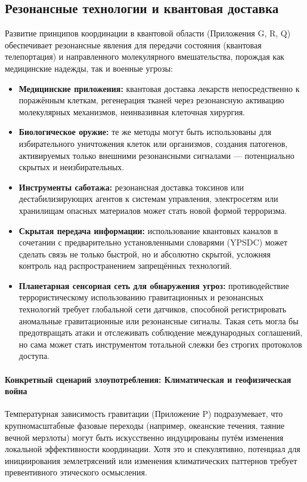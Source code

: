 \documentclass[12pt,a4paper]{article}
\theoremstyle{remark}
\begin{document}
	\subsection{Резонансные технологии и квантовая доставка}
	\label{subsec:resonance}
	
	Развитие принципов координации в квантовой области (Приложения G, R, Q) обеспечивает резонансные явления для передачи состояния (квантовая телепортация) и направленного молекулярного вмешательства, порождая как медицинские надежды, так и военные угрозы:
	\begin{itemize}[leftmargin=*]
		\item \textbf{Медицинские приложения:} квантовая доставка лекарств непосредственно к поражённым клеткам, регенерация тканей через резонансную активацию молекулярных механизмов, неинвазивная клеточная хирургия.
		\item \textbf{Биологическое оружие:} те же методы могут быть использованы для избирательного уничтожения клеток или организмов, создания патогенов, активируемых только внешними резонансными сигналами — потенциально скрытых и неизбирательных.
		\item \textbf{Инструменты саботажа:} резонансная доставка токсинов или дестабилизирующих агентов к системам управления, электросетям или хранилищам опасных материалов может стать новой формой терроризма.
		\item \textbf{Скрытая передача информации:} использование квантовых каналов в сочетании с предварительно установленными словарями (YPSDC) может сделать связь не только быстрой, но и абсолютно скрытой, усложняя контроль над распространением запрещённых технологий.
		\item \textbf{Планетарная сенсорная сеть для обнаружения угроз:} противодействие террористическому использованию гравитационных и резонансных технологий требует глобальной сети датчиков, способной регистрировать аномальные гравитационные или резонансные сигналы. Такая сеть могла бы предотвращать атаки и отслеживать соблюдение международных соглашений, но сама может стать инструментом тотальной слежки без строгих протоколов доступа.
	\end{itemize}
	
	\paragraph{Конкретный сценарий злоупотребления: Климатическая и геофизическая война}
	Температурная зависимость гравитации (Приложение P) подразумевает, что крупномасштабные фазовые переходы (например, океанские течения, таяние вечной мерзлоты) могут быть искусственно индуцированы путём изменения локальной эффективности координации. Хотя это и спекулятивно, потенциал для инициирования землетрясений или изменения климатических паттернов требует превентивного этического осмысления.
	
\end{document}
